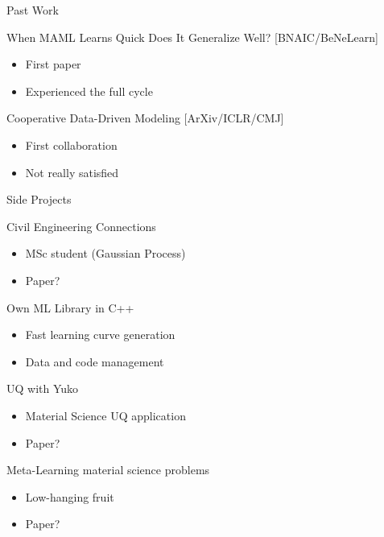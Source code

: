 \documentclass[aspectratio=169]{beamer}
\begin{document}
\begin{frame}{Past Work}
  \begin{minipage}{\textwidth}
    \color{Pink} When MAML Learns Quick Does It Generalize Well? [BNAIC/BeNeLearn]
    \begin{itemize}
      \item First paper
      \item Experienced the full cycle
    \end{itemize}
  \end{minipage}
  \begin{minipage}{\textwidth}
  {
    \color{Pink} Cooperative Data-Driven Modeling [ArXiv/ICLR/CMJ]
    \begin{itemize}
      \item First collaboration 
      \item Not really satisfied 
    \end{itemize}
  }
  \end{minipage}
\end{frame}

\begin{frame}{Side Projects}
  \begin{minipage}{0.5\textwidth}
  {
    \color{Pink} Civil Engineering Connections
    \begin{itemize}
      \item MSc student (Gaussian Process)
      \item Paper?
    \end{itemize}
  }
  {
    \color{Pink} Own ML Library in C++
    \begin{itemize}
      \item Fast learning curve generation
      \item Data and code management
    \end{itemize}
  }
  \end{minipage}%
  \begin{minipage}{0.5\textwidth}
  {
    \color{Pink} UQ with Yuko
    \begin{itemize}
      \item Material Science UQ application
      \item Paper?
    \end{itemize}
  }
  {
    \color{Pink} Meta-Learning material science problems
    \begin{itemize}
      \item Low-hanging fruit
      \item Paper?
    \end{itemize}
  }
  \end{minipage}
\end{frame}
\end{document}
